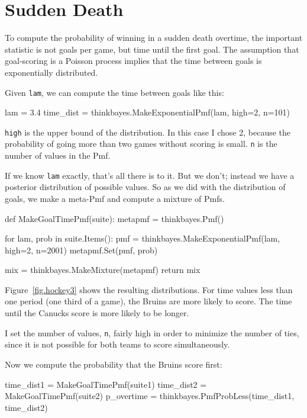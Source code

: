 \documentclass[12pt]{book}
\theoremstyle{exercise}
\begin{document}
\section{Sudden Death}

To compute the probability of winning in a sudden death overtime,
the important statistic is not goals per game, but time until the
first goal.  The assumption that goal-scoring is a Poisson process
implies that the time between goals
is exponentially distributed.

Given {\tt lam}, we can compute the time between goals like this: 

\begin{code}
lam = 3.4
time_dist = thinkbayes.MakeExponentialPmf(lam, high=2, n=101)
\end{code}  

{\tt high} is the upper bound of the distribution.  In this case
I chose 2, because the probability of going more than two games
without scoring is small.  {\tt n} is the number of values in
the Pmf.

If we know {\tt lam} exactly, that's all there is to it.
But we don't; instead we have a posterior
distribution of possible values.  So as we did with the distribution
of goals, we make a meta-Pmf and compute a mixture of
Pmfs.

\begin{code}
def MakeGoalTimePmf(suite):
    metapmf = thinkbayes.Pmf()

    for lam, prob in suite.Items():
        pmf = thinkbayes.MakeExponentialPmf(lam, high=2, n=2001)
        metapmf.Set(pmf, prob)

    mix = thinkbayes.MakeMixture(metapmf)
    return mix
\end{code}  

Figure~\ref{fig.hockey3} shows the resulting distributions.  For
time values less than one period (one third of a game), the Bruins
are more likely to score.  The time until the Canucks score is
more likely to be longer.

I set the number of values, {\tt n}, fairly high in order to minimize
the number of ties, since it is not possible for both teams
to score simultaneously.

Now we compute the probability that the Bruins score first:

\begin{code}
    time_dist1 = MakeGoalTimePmf(suite1)
    time_dist2 = MakeGoalTimePmf(suite2)
    p_overtime = thinkbayes.PmfProbLess(time_dist1, time_dist2)
\end{code}  
\end{document}
